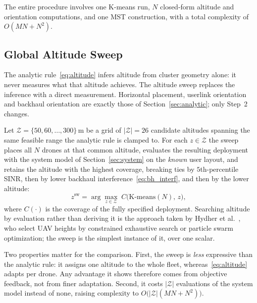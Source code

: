\documentclass[conference]{IEEEtran}
\begin{document}
The entire procedure involves one K-means run, $N$ closed-form altitude and orientation computations, and one MST construction, with a total complexity of $O(MN + N^2)$.

\subsection{Global Altitude Sweep}
\label{sec:sweep}

The analytic rule~\eqref{eq:altitude} infers altitude from cluster geometry alone: it never measures what that altitude achieves. The altitude sweep replaces the inference with a direct measurement. Horizontal placement, userlink orientation and backhaul orientation are exactly those of Section~\ref{sec:analytic}; only Step~2 changes.

Let $\mathcal{Z} = \{50, 60, \ldots, 300\}$\,m be a grid of $|\mathcal{Z}| = 26$ candidate altitudes spanning the same feasible range the analytic rule is clamped to. For each $z \in \mathcal{Z}$ the sweep places all $N$ drones at that common altitude, evaluates the resulting deployment with the system model of Section~\ref{sec:system} on the \emph{known} user layout, and retains the altitude with the highest coverage, breaking ties by $5$th-percentile SINR, then by lower backhaul interference~\eqref{eq:bh_interf}, and then by the lower altitude:
\begin{equation}
\label{eq:sweep}
z^{\mathrm{sw}} = \arg\max_{z \in \mathcal{Z}} \; C\big(\text{K-means}(N),\, z\big),
\end{equation}
where $C(\cdot)$ is the coverage of the fully specified deployment. Searching altitude by evaluation rather than deriving it is the approach taken by Hydher et al.~\cite{hydher2020}, who select UAV heights by constrained exhaustive search or particle swarm optimization; the sweep is the simplest instance of it, over one scalar.

Two properties matter for the comparison. First, the sweep is \emph{less} expressive than the analytic rule: it assigns one altitude to the whole fleet, whereas~\eqref{eq:altitude} adapts per drone. Any advantage it shows therefore comes from objective feedback, not from finer adaptation. Second, it costs $|\mathcal{Z}|$ evaluations of the system model instead of none, raising complexity to $O\big(|\mathcal{Z}|(MN + N^2)\big)$. 
\end{document}
